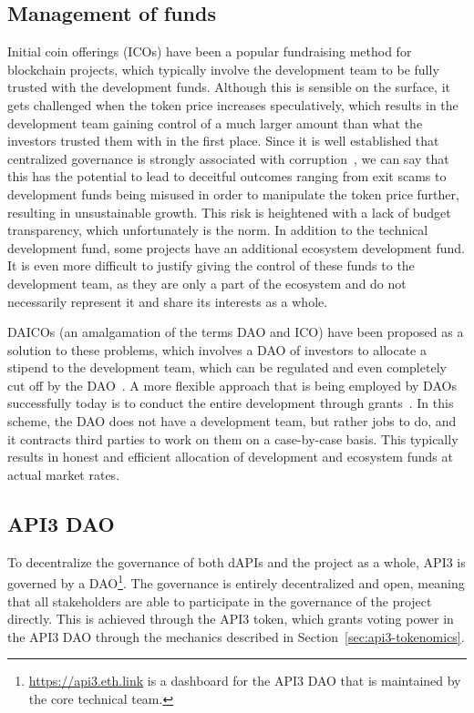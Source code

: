 \documentclass[11pt]{article}
\begin{document}
\subsection{Management of funds}
\label{sec:management-of-funds}

Initial coin offerings (ICOs) have been a popular fundraising method for blockchain projects, which typically involve the development team to be fully trusted with the development funds.
Although this is sensible on the surface, it gets challenged when the token price increases speculatively, which results in the development team gaining control of a much larger amount than what the investors trusted them with in the first place.
Since it is well established that centralized governance is strongly associated with corruption~\cite{fisman:2002}, we can say that this has the potential to lead to deceitful outcomes ranging from exit scams to development funds being misused in order to manipulate the token price further, resulting in unsustainable growth.
This risk is heightened with a lack of budget transparency, which unfortunately is the norm.
In addition to the technical development fund, some projects have an additional ecosystem development fund.
It is even more difficult to justify giving the control of these funds to the development team, as they are only a part of the ecosystem and do not necessarily represent it and share its interests as a whole.

DAICOs (an amalgamation of the terms DAO and ICO) have been proposed as a solution to these problems, which involves a DAO of investors to allocate a stipend to the development team, which can be regulated and even completely cut off by the DAO~\cite{buterin:2018}.
A more flexible approach that is being employed by DAOs successfully today is to conduct the entire development through grants~\cite{dxdao:2019}.
In this scheme, the DAO does not have a development team, but rather jobs to do, and it contracts third parties to work on them on a case-by-case basis.
This typically results in honest and efficient allocation of development and ecosystem funds at actual market rates.

\subsection{API3 DAO}
\label{sec:api3-dao}

To decentralize the governance of both dAPIs and the project as a whole, API3 is governed by a DAO\footnote{\url{https://api3.eth.link} is a dashboard for the API3 DAO that is maintained by the core technical team.}.
The governance is entirely decentralized and open, meaning that all stakeholders are able to participate in the governance of the project directly.
This is achieved through the API3 token, which grants voting power in the API3 DAO through the mechanics described in Section~\ref{sec:api3-tokenomics}.
\end{document}

